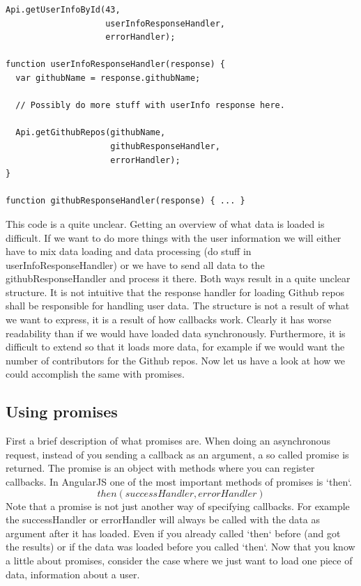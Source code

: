 \documentclass[a4paper,12pt]{article}
\begin{document}
\begin{lstlisting}[caption={Code, using callbacks, showing how we can load two pieces of data, where the second is dependent on the first}, frame=single]
Api.getUserInfoById(43, 
                    userInfoResponseHandler, 
                    errorHandler);

function userInfoResponseHandler(response) {
  var githubName = response.githubName;

  // Possibly do more stuff with userInfo response here.

  Api.getGithubRepos(githubName, 
                     githubResponseHandler, 
                     errorHandler);
}

function githubResponseHandler(response) { ... }
\end{lstlisting}
This code is a quite unclear. Getting an overview of what data is loaded is difficult. If we want to do more things with the user information we will either have to mix data loading and data processing (do stuff in userInfoResponseHandler) or we
have to send all data to the githubResponseHandler and process it there. Both ways result in a quite unclear structure. It is not intuitive that the response handler for loading Github repos shall be responsible for handling user data. The structure is not a result of what we want to express, it is a result of how callbacks work. 
Clearly it has worse readability than if we would have loaded data synchronously.
Furthermore, it is difficult to extend so that it loads more data, for example if we would want the number of contributors for the Github repos. Now let us have a look at how we could accomplish the same with promises.

\subsection{Using promises}
First a brief description of what promises are. When doing an asynchronous request, instead of you sending a callback as an argument, a so called promise is returned. The promise is an object with methods where you can register callbacks.
In AngularJS one of the most important methods of promises is `then`.
\[ then(successHandler, errorHandler) \]
Note that a promise is not just another way of specifying callbacks. For example the successHandler or errorHandler will always be called with the data as argument after it has loaded.
Even if you already called `then` before (and got the results) or if the data was loaded before you called `then`.
Now that you know a little about promises, consider the case where we just want to load one piece of data, information about a user.
\end{document}
